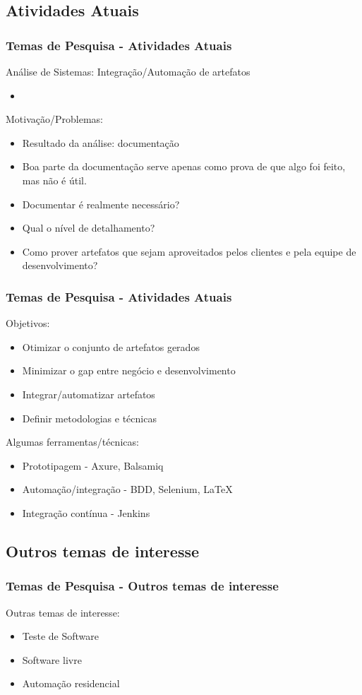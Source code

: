 \subsection{Atividades Atuais}
\begin{frame}
	\frametitle{Temas de Pesquisa - Atividades Atuais}
	Análise de Sistemas: Integração/Automação de artefatos
	\begin{itemize}
		\item[]
	\end{itemize}

	Motivação/Problemas:
	\begin{itemize}
		\item Resultado da análise: documentação
		\item Boa parte da documentação serve apenas como prova de que algo foi feito, mas não é útil.
		\item Documentar é realmente necessário? 
		\item Qual o nível de detalhamento?
		\item Como prover artefatos que sejam aproveitados pelos clientes e pela equipe de desenvolvimento?
	\end{itemize}
\end{frame}

\begin{frame}
	\frametitle{Temas de Pesquisa - Atividades Atuais}
	Objetivos:
	\begin{itemize}
		\item Otimizar o conjunto de artefatos gerados
		\item Minimizar o gap entre negócio e desenvolvimento
		\item Integrar/automatizar artefatos
		\item Definir metodologias e técnicas
	\end{itemize}

	Algumas ferramentas/técnicas:
	\begin{itemize}
		\item Prototipagem - Axure, Balsamiq
		\item Automação/integração - BDD, Selenium, \LaTeX
		\item Integração contínua - Jenkins
	\end{itemize}
\end{frame}

\subsection{Outros temas de interesse}
\begin{frame}
	\frametitle{Temas de Pesquisa - Outros temas de interesse}
	Outras temas de interesse:
	\begin{itemize}
		\item Teste de Software
		\item Software livre
		\item Automação residencial
	\end{itemize}
\end{frame}

